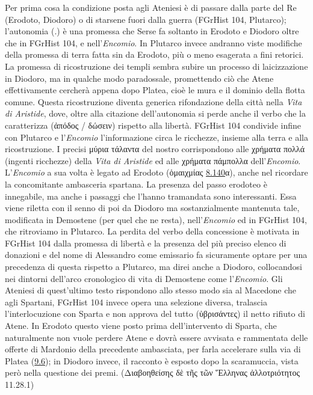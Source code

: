 {    Per prima cosa la condizione posta agli Ateniesi è di passare dalla parte del Re (Erodoto, Diodoro) o di starsene fuori dalla guerra (FGrHist 104, Plutarco); l'autonomia (\cite[14s]{Ostwald1982}.) è una promessa che Serse fa soltanto in Erodoto e  Diodoro oltre che in  FGrHist 104, e nell'\emph{Encomio}. In Plutarco invece andranno viste modifiche della promessa di terra fatta sin da Erodoto, più o meno esagerata a fini retorici. La promessa di ricostruzione dei templi sembra subire un processo di laicizzazione in Diodoro, ma in qualche modo paradossale, promettendo ciò che Atene effettivamente cercherà appena dopo Platea, cioè le mura e il dominio della flotta comune. Questa ricostruzione diventa generica rifondazione della città nella \emph{Vita di Aristide}, dove, oltre alla citazione dell'autonomia si perde anche il verbo che la caratterizza (\textgreek{ἀπόδος / δώσειν}) rispetto alla libertà. FGrHist 104 condivide infine con Plutarco e l'\emph{Encomio} l'informazione circa le ricchezze, insieme alla terra e alla ricostruzione. I precisi \textgreek{ μύρια τάλαντα} del nostro corrispondono alle \textgreek{χρήματα πολλά} (ingenti ricchezze) della \emph{Vita di Aristide} ed alle \textgreek{χρήματα πάμπολλα} dell'\emph{Encomio}. L'\emph{Encomio} a sua volta è legato ad Erodoto (\textgreek{ὁμαιχμίας} \href{http://data.perseus.org/citations/urn:cts:greekLit:tlg0016.tlg001.perseus-grc1:8.140}{8.140}\textgreek{α}), anche nel ricordare la concomitante ambasceria spartana. La presenza del passo erodoteo è innegabile, ma anche i passaggi che l'hanno tramandata sono interessanti. Essa viene riletta con il senno di poi da  Diodoro ma sostanzialmente mantenuta tale, modificata in Demostene (per quel che ne resta), nell'\emph{Encomio} ed in FGrHist 104, che ritroviamo in Plutarco. La perdita del verbo della concessione è motivata in FGrHist 104 dalla promessa di libertà e la presenza del più preciso elenco di donazioni e del nome di Alessandro come emissario fa sicuramente optare per una precedenza di questa rispetto a Plutarco, ma direi anche a Diodoro, collocandosi nei dintorni dell'arco cronologico di vita di Demostene come l'\emph{Encomio}. Gli Ateniesi di quest'ultimo testo rispondono allo stesso modo sia al Macedone che agli Spartani, FGrHist 104 invece opera una selezione diversa, tralascia l'interlocuzione con Sparta e non approva del tutto (\textgreek{ὑβρισάντες}) il netto rifiuto di Atene. In Erodoto questo viene posto prima dell'intervento di Sparta, che naturalmente non vuole perdere Atene e dovrà essere avvisata e rammentata delle offerte di Mardonio della precedente ambasciata, per farla accelerare sulla via di Platea (\href{http://data.perseus.org/citations/urn:cts:greekLit:tlg0016.tlg001.perseus-grc1:9.6}{9.6}); in  Diodoro invece, il racconto è esposto dopo la scaramuccia, vista però nella questione dei premi. (\textgreek{Διαβοηθείσης δὲ τῆς  τῶν Ἕλληνας ἀλλοτριότητος} 11.28.1)
}
